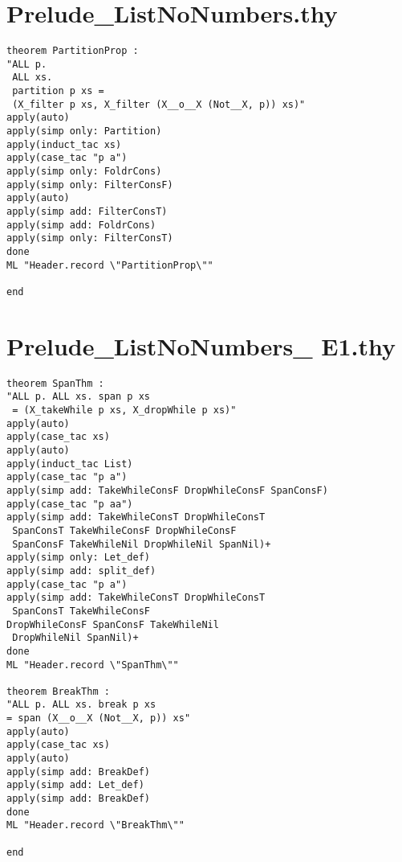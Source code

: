 \section{Prelude\_ListNoNumbers.thy}
\label{appendix:strictProofs:List}
\begin{multicols}{2}
\tiny
\begin{Verbatim}
theorem PartitionProp :
"ALL p.
 ALL xs.
 partition p xs =
 (X_filter p xs, X_filter (X__o__X (Not__X, p)) xs)"
apply(auto)
apply(simp only: Partition)
apply(induct_tac xs)
apply(case_tac "p a")
apply(simp only: FoldrCons)
apply(simp only: FilterConsF)
apply(auto)
apply(simp add: FilterConsT)
apply(simp add: FoldrCons)
apply(simp only: FilterConsT)
done
ML "Header.record \"PartitionProp\""

end
\end{Verbatim}
\end{multicols}

\pagebreak
\section{Prelude\_ListNoNumbers\_ E1.thy}
\label{appendix:strictProofs:ListE1}
\begin{multicols}{2}
\tiny
\begin{Verbatim}
theorem SpanThm :
"ALL p. ALL xs. span p xs
 = (X_takeWhile p xs, X_dropWhile p xs)"
apply(auto)
apply(case_tac xs)
apply(auto)
apply(induct_tac List)
apply(case_tac "p a")
apply(simp add: TakeWhileConsF DropWhileConsF SpanConsF)
apply(case_tac "p aa")
apply(simp add: TakeWhileConsT DropWhileConsT
 SpanConsT TakeWhileConsF DropWhileConsF
 SpanConsF TakeWhileNil DropWhileNil SpanNil)+
apply(simp only: Let_def)
apply(simp add: split_def)
apply(case_tac "p a")
apply(simp add: TakeWhileConsT DropWhileConsT
 SpanConsT TakeWhileConsF
DropWhileConsF SpanConsF TakeWhileNil
 DropWhileNil SpanNil)+
done
ML "Header.record \"SpanThm\""

theorem BreakThm :
"ALL p. ALL xs. break p xs 
= span (X__o__X (Not__X, p)) xs"
apply(auto)
apply(case_tac xs)
apply(auto)
apply(simp add: BreakDef)
apply(simp add: Let_def)
apply(simp add: BreakDef)
done
ML "Header.record \"BreakThm\""

end
\end{Verbatim}
\end{multicols}

